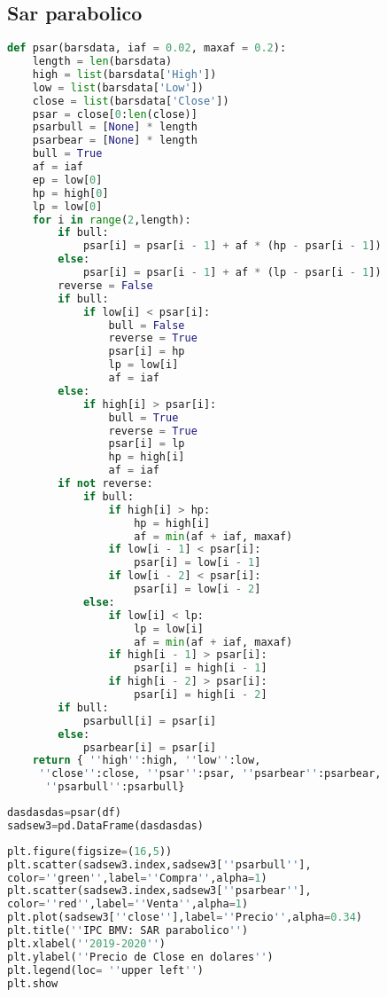 \documentclass[letterpaper,12pt,oneside]{book}
\begin{document}
\subsection{Sar parabolico}
\begin{lstlisting}[language=Python]
def psar(barsdata, iaf = 0.02, maxaf = 0.2):
    length = len(barsdata)
    high = list(barsdata['High'])
    low = list(barsdata['Low'])
    close = list(barsdata['Close'])
    psar = close[0:len(close)]
    psarbull = [None] * length
    psarbear = [None] * length
    bull = True
    af = iaf
    ep = low[0]
    hp = high[0]
    lp = low[0]
    for i in range(2,length):
        if bull:
            psar[i] = psar[i - 1] + af * (hp - psar[i - 1])
        else:
            psar[i] = psar[i - 1] + af * (lp - psar[i - 1])
        reverse = False
        if bull:
            if low[i] < psar[i]:
                bull = False
                reverse = True
                psar[i] = hp
                lp = low[i]
                af = iaf
        else:
            if high[i] > psar[i]:
                bull = True
                reverse = True
                psar[i] = lp
                hp = high[i]
                af = iaf
        if not reverse:
            if bull:
                if high[i] > hp:
                    hp = high[i]
                    af = min(af + iaf, maxaf)
                if low[i - 1] < psar[i]:
                    psar[i] = low[i - 1]
                if low[i - 2] < psar[i]:
                    psar[i] = low[i - 2]
            else:
                if low[i] < lp:
                    lp = low[i]
                    af = min(af + iaf, maxaf)
                if high[i - 1] > psar[i]:
                    psar[i] = high[i - 1]
                if high[i - 2] > psar[i]:
                    psar[i] = high[i - 2]
        if bull:
            psarbull[i] = psar[i]
        else:
            psarbear[i] = psar[i]
    return { ''high'':high, ''low'':low,
     ''close'':close, ''psar'':psar, ''psarbear'':psarbear,
      ''psarbull'':psarbull}

\end{lstlisting}   
    
\begin{lstlisting}[language=Python]
dasdasdas=psar(df)
sadsew3=pd.DataFrame(dasdasdas)
\end{lstlisting}




\begin{lstlisting}[language=Python]
plt.figure(figsize=(16,5))
plt.scatter(sadsew3.index,sadsew3[''psarbull''],
color=''green'',label=''Compra'',alpha=1)
plt.scatter(sadsew3.index,sadsew3[''psarbear''],
color=''red'',label=''Venta'',alpha=1)
plt.plot(sadsew3[''close''],label=''Precio'',alpha=0.34)
plt.title(''IPC BMV: SAR parabolico'')
plt.xlabel(''2019-2020'')
plt.ylabel(''Precio de Close en dolares'')
plt.legend(loc= ''upper left'')
plt.show
\end{lstlisting}
\end{document}
